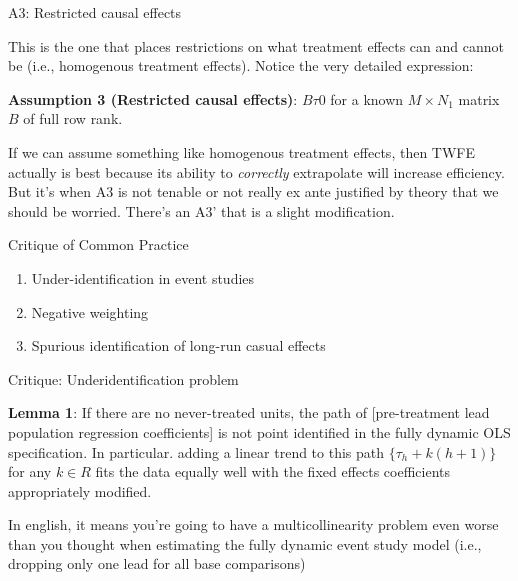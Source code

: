 \documentclass{beamer}
\begin{document}
\begin{frame}{A3: Restricted causal effects}

This is the one that places restrictions on what treatment effects can and cannot be (i.e., homogenous treatment effects). Notice the very detailed expression:

\bigskip

\textbf{Assumption 3 (Restricted causal effects)}: $B\tau0$ for a known $M \times N_1$ matrix $B$ of full row rank. 

\bigskip

If we can assume something like homogenous treatment effects, then TWFE actually is best because its ability to \emph{correctly} extrapolate will increase efficiency. But it's when A3 is not tenable or not really ex ante justified by theory that we should be worried. There's an A3' that is a slight modification. 

\end{frame}


\begin{frame}{Critique of Common Practice}

\begin{enumerate}
\item Under-identification in event studies
\item Negative weighting
\item Spurious identification of long-run casual effects
\end{enumerate}

\end{frame}

\begin{frame}{Critique: Underidentification problem}


\textbf{Lemma 1}: If there are no never-treated units, the path of [pre-treatment lead population regression coefficients] is not point identified in the fully dynamic OLS specification.  In particular. adding a linear trend to this path $\{\tau_h + k(h+1) \}$ for any $k \in R$ fits the data equally well with the fixed effects coefficients appropriately modified.

\bigskip

In english, it means you're going to have a multicollinearity problem even worse than you thought when estimating the fully dynamic event study model (i.e., dropping only one lead for all base comparisons)

\end{frame}
\end{document}
